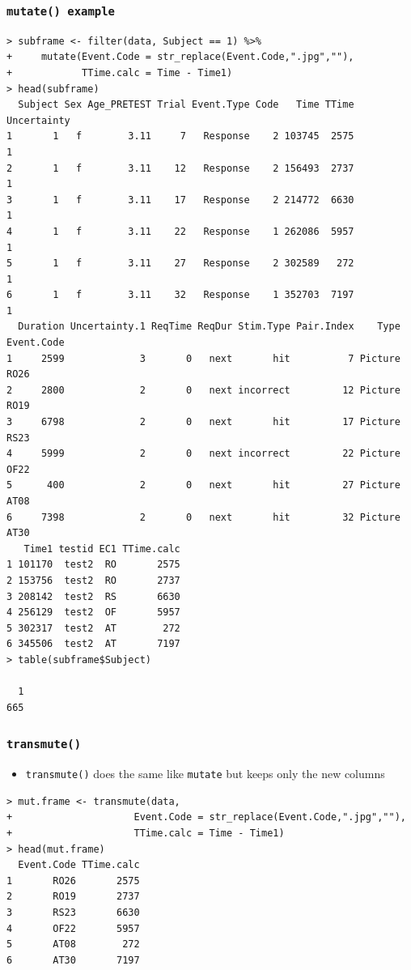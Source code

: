 \documentclass[xcolor={table},c]{beamer}
\begin{document}
\begin{frame}[fragile]\frametitle{\texttt{mutate() example}}\tiny
\begin{verbatim}
> subframe <- filter(data, Subject == 1) %>%
+     mutate(Event.Code = str_replace(Event.Code,".jpg",""),
+            TTime.calc = Time - Time1)
> head(subframe)
  Subject Sex Age_PRETEST Trial Event.Type Code   Time TTime Uncertainty
1       1   f        3.11     7   Response    2 103745  2575           1
2       1   f        3.11    12   Response    2 156493  2737           1
3       1   f        3.11    17   Response    2 214772  6630           1
4       1   f        3.11    22   Response    1 262086  5957           1
5       1   f        3.11    27   Response    2 302589   272           1
6       1   f        3.11    32   Response    1 352703  7197           1
  Duration Uncertainty.1 ReqTime ReqDur Stim.Type Pair.Index    Type Event.Code
1     2599             3       0   next       hit          7 Picture       RO26
2     2800             2       0   next incorrect         12 Picture       RO19
3     6798             2       0   next       hit         17 Picture       RS23
4     5999             2       0   next incorrect         22 Picture       OF22
5      400             2       0   next       hit         27 Picture       AT08
6     7398             2       0   next       hit         32 Picture       AT30
   Time1 testid EC1 TTime.calc
1 101170  test2  RO       2575
2 153756  test2  RO       2737
3 208142  test2  RS       6630
4 256129  test2  OF       5957
5 302317  test2  AT        272
6 345506  test2  AT       7197
> table(subframe$Subject)

  1 
665   
\end{verbatim}
\end{frame}

\begin{frame}[fragile]\frametitle{\texttt{transmute()}}
  \begin{itemize}
  \item \texttt{transmute()} does the same like \texttt{mutate{}} but keeps only the new columns
  \end{itemize}\footnotesize
\begin{verbatim}
> mut.frame <- transmute(data,
+                     Event.Code = str_replace(Event.Code,".jpg",""),
+                     TTime.calc = Time - Time1)
> head(mut.frame)
  Event.Code TTime.calc
1       RO26       2575
2       RO19       2737
3       RS23       6630
4       OF22       5957
5       AT08        272
6       AT30       7197
\end{verbatim}
\end{frame}
\end{document}
